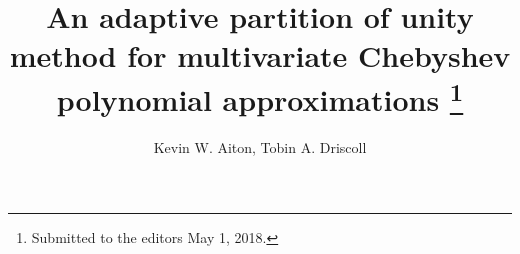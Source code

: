 

\usepackage{lipsum}
\usepackage{amsfonts}
\usepackage{graphicx}
\usepackage{epstopdf}
\usepackage{algorithmic}
\ifpdf
\else
\fi

\newcommand{\creflastconjunction}{, and~}






\title{An adaptive partition of unity method for multivariate Chebyshev polynomial  approximations \thanks{Submitted to the editors May 1, 2018.
}}

\author{Kevin W. Aiton, Tobin A. Driscoll}

\usepackage{amsopn}
\DeclareMathOperator{\diag}{diag}


